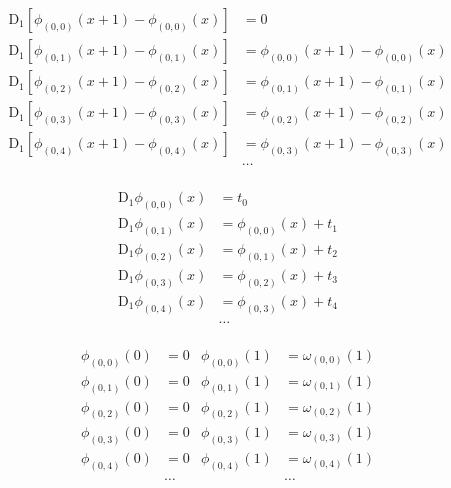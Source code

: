 \begin{equation*} \begin{aligned}
\mathrm{D}_1 \left[\phi_{(0,0)}(x + 1) - \phi_{(0,0)}(x) \right] &= 0
\\
\mathrm{D}_1 \left[\phi_{(0,1)}(x + 1) - \phi_{(0,1)}(x) \right] &= \phi_{(0,0)}(x + 1) - \phi_{(0,0)}(x)  
\\
\mathrm{D}_1 \left[\phi_{(0,2)}(x + 1) - \phi_{(0,2)}(x) \right] &= \phi_{(0,1)}(x + 1) - \phi_{(0,1)}(x)  
\\
\mathrm{D}_1 \left[\phi_{(0,3)}(x + 1) - \phi_{(0,3)}(x) \right] &= \phi_{(0,2)}(x + 1) - \phi_{(0,2)}(x)  
\\
\mathrm{D}_1 \left[\phi_{(0,4)}(x + 1) - \phi_{(0,4)}(x) \right] &= \phi_{(0,3)}(x + 1) - \phi_{(0,3)}(x)  
\\
&\ldots \\
\end{aligned} \end{equation*}

\begin{equation*} \begin{aligned}
\mathrm{D}_1 \phi_{(0,0)}(x) &= t_0  
\\
\mathrm{D}_1 \phi_{(0,1)}(x) &= \phi_{(0,0)}(x) + t_1  
\\
\mathrm{D}_1 \phi_{(0,2)}(x) &= \phi_{(0,1)}(x) + t_2  
\\
\mathrm{D}_1 \phi_{(0,3)}(x) &= \phi_{(0,2)}(x) + t_3 
\\
\mathrm{D}_1 \phi_{(0,4)}(x) &= \phi_{(0,3)}(x) + t_4 
\\
&\ldots
\\
\end{aligned} \end{equation*}

\begin{equation*} \begin{aligned}
\phi_{(0,0)}(0) &= 0 & \phi_{(0,0)}(1) &= \omega_{(0,0)}(1)
\\
\phi_{(0,1)}(0) &= 0 & \phi_{(0,1)}(1) &= \omega_{(0,1)}(1)
\\
\phi_{(0,2)}(0) &= 0 & \phi_{(0,2)}(1) &= \omega_{(0,2)}(1)
\\
\phi_{(0,3)}(0) &= 0 & \phi_{(0,3)}(1) &= \omega_{(0,3)}(1)
\\
\phi_{(0,4)}(0) &= 0 & \phi_{(0,4)}(1) &= \omega_{(0,4)}(1)
\\
&\ldots & &\ldots
\\
\end{aligned} \end{equation*}

